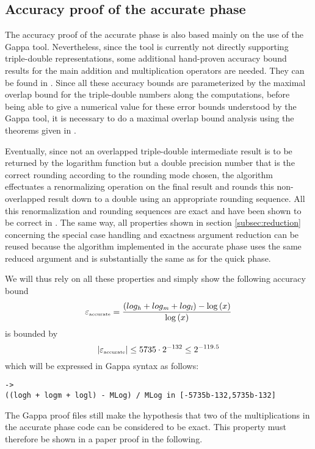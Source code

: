 \subsection{Accuracy proof of the accurate phase\label{subsec:accuratephase}}
The accuracy proof of the accurate phase is also based mainly on the use of the Gappa tool. 
Nevertheless, since the tool is currently not directly supporting triple-double representations, some additional
hand-proven accuracy bound results for the main addition and multiplication operators are needed. They can be
found in \cite{Lauter2005LIP:tripledouble}. Since all these accuracy bounds are parameterized by the maximal overlap bound
for the triple-double numbers along the computations, before being able to give a numerical value for
these error bounds understood by the Gappa tool, it is necessary to do a maximal overlap bound analysis using
the theorems given in \cite{Lauter2005LIP:tripledouble}.\par
Eventually, since not an overlapped triple-double intermediate result is to be returned by the logarithm function but a 
double precision number that is the correct rounding according to the rounding mode chosen, the algorithm effectuates
a renormalizing operation on the final result and rounds this non-overlapped result down to a double using an
appropriate rounding sequence. All this renormalization and rounding sequences are exact and have been shown to be
correct in \cite{Lauter2005LIP:tripledouble}. The same way, all properties shown in section \ref{subsec:reduction} 
concerning the special case handling and exactness argument reduction can be reused because the algorithm implemented in
the accurate phase uses the same reduced argument and is substantially the same as for the quick phase. \par
We will thus rely on all these properties and simply show the following accuracy bound
$$\epsilon_{\mbox{\tiny accurate}} = \frac{\left( log_\hi + log_\mi + log_\lo \right) - \log\left( x \right)}{\log\left( x \right)}$$
is bounded by 
$$\left \vert \epsilon_{\mbox{\tiny accurate}} \right \vert \leq 5735 \cdot 2^{-132} \leq 2^{-119.5}$$
which will be expressed in Gappa syntax as follows:
\begin{lstlisting}[caption={Accuracy bound to prove for the accurate phase},firstnumber=165]
->
((logh + logm + logl) - MLog) / MLog in [-5735b-132,5735b-132]
\end{lstlisting}
The Gappa proof files still make the hypothesis that two of the multiplications in the accurate phase code can be 
considered to be 
exact. This property must therefore be shown in a paper proof in the following. 

